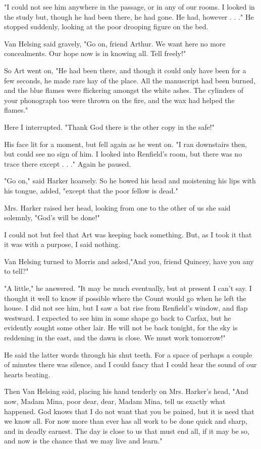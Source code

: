 "I could not see him anywhere in the passage, or in any of our rooms. I looked in the study but, though he had been there, he had gone. He had, however . . ." He stopped suddenly, looking at the poor drooping figure on the bed. 

Van Helsing said gravely, "Go on, friend Arthur. We want here no more concealments. Our hope now is in knowing all. Tell freely!" 

So Art went on, "He had been there, and though it could only have been for a few seconds, he made rare hay of the place. All the manuscript had been burned, and the blue flames were flickering amongst the white ashes. The cylinders of your phonograph too were thrown on the fire, and the wax had helped the flames." 

Here I interrupted. "Thank God there is the other copy in the safe!" 

His face lit for a moment, but fell again as he went on. "I ran downstairs then, but could see no sign of him. I looked into Renfield's room, but there was no trace there except . . ." Again he paused. 

"Go on," said Harker hoarsely. So he bowed his head and moistening his lips with his tongue, added, "except that the poor fellow is dead." 

Mrs. Harker raised her head, looking from one to the other of us she said solemnly, "God's will be done!" 

I could not but feel that Art was keeping back something. But, as I took it that it was with a purpose, I said nothing. 

Van Helsing turned to Morris and asked,"And you, friend Quincey, have you any to tell?" 

"A little," he answered. "It may be much eventually, but at present I can't say. I thought it well to know if possible where the Count would go when he left the house. I did not see him, but I saw a bat rise from Renfield's window, and flap westward. I expected to see him in some shape go back to Carfax, but he evidently sought some other lair. He will not be back tonight, for the sky is reddening in the east, and the dawn is close. We must work tomorrow!" 

He said the latter words through his shut teeth. For a space of perhaps a couple of minutes there was silence, and I could fancy that I could hear the sound of our hearts beating. 

Then Van Helsing said, placing his hand tenderly on Mrs. Harker's head, "And now, Madam Mina, poor dear, dear, Madam Mina, tell us exactly what happened. God knows that I do not want that you be pained, but it is need that we know all. For now more than ever has all work to be done quick and sharp, and in deadly earnest. The day is close to us that must end all, if it may be so, and now is the chance that we may live and learn." 

